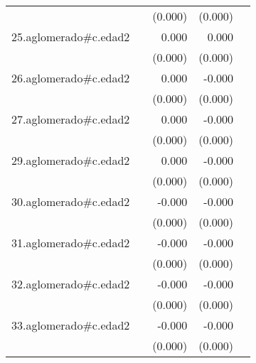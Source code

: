 {\begin{longtable}{l*{4}{D{.}{.}{-1}}}
            &                     &     (0.000)         &     (0.000)         &                     \\
\addlinespace
25.aglomerado#c.edad2&                     &       0.000\sym{*}  &       0.000         &                     \\
            &                     &     (0.000)         &     (0.000)         &                     \\
\addlinespace
26.aglomerado#c.edad2&                     &       0.000         &      -0.000         &                     \\
            &                     &     (0.000)         &     (0.000)         &                     \\
\addlinespace
27.aglomerado#c.edad2&                     &       0.000         &      -0.000         &                     \\
            &                     &     (0.000)         &     (0.000)         &                     \\
\addlinespace
29.aglomerado#c.edad2&                     &       0.000         &      -0.000         &                     \\
            &                     &     (0.000)         &     (0.000)         &                     \\
\addlinespace
30.aglomerado#c.edad2&                     &      -0.000         &      -0.000\sym{***}&                     \\
            &                     &     (0.000)         &     (0.000)         &                     \\
\addlinespace
31.aglomerado#c.edad2&                     &      -0.000         &      -0.000\sym{**} &                     \\
            &                     &     (0.000)         &     (0.000)         &                     \\
\addlinespace
32.aglomerado#c.edad2&                     &      -0.000         &      -0.000\sym{***}&                     \\
            &                     &     (0.000)         &     (0.000)         &                     \\
\addlinespace
33.aglomerado#c.edad2&                     &      -0.000         &      -0.000\sym{***}&                     \\
            &                     &     (0.000)         &     (0.000)         &                     \\

\end{longtable}}
